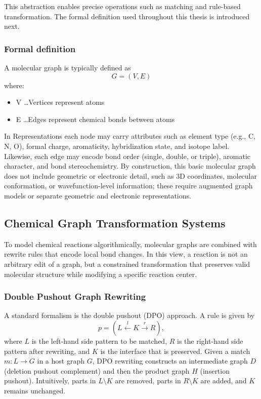 This abstraction enables precise operations such as matching and rule-based transformation. \cite[pp.~2--3]{Andersen2013} 
The formal definition used throughout this thesis is introduced next.

\subsubsection{Formal definition}

A molecular graph is typically defined as \cite[p.~2]{Ehrlich2012} \cite[p.~3]{Fujita2025}
\begin{equation}
    G = (V, E)
\end{equation}
where:
\begin{itemize}
    \item V \ldots Vertices represent atoms
    \item E \ldots Edges represent chemical bonds between atoms
\end{itemize}

In Representations each node may carry attributes such as element type (e.g., C, N, O), formal charge, aromaticity, hybridization state, and isotope label.
Likewise, each edge may encode bond order (single, double, or triple), aromatic character, and bond stereochemistry. \cite[pp.~4--5]{Wojtuch2023}
By construction, this basic molecular graph does not include geometric or electronic detail, such as 3D coordinates, molecular conformation, or wavefunction-level information; these require augmented graph models or separate geometric and electronic representations.
\cite[pp.~3--4]{Wojtuch2023} \cite[p.~595]{Kearnes2016}



\subsection{Chemical Graph Transformation Systems}
To model chemical reactions algorithmically, molecular graphs are combined with rewrite rules that encode local bond changes. \cite[p.~76]{Echahed2016}
In this view, a reaction is not an arbitrary edit of a graph, but a constrained transformation that preserves valid molecular structure while modifying a specific reaction center. \cite[p.~2]{Andersen2013} \cite[p.~6]{Abel2026}

\subsubsection{Double Pushout Graph Rewriting}
A standard formalism is the double pushout (DPO) approach. \cite[p.~3]{Andersen2013} A rule is given by 
\[
p = (L \xleftarrow{l} K \xrightarrow{r} R),
\]
where \(L\) is the left-hand side pattern to be matched, \(R\) is the right-hand side pattern after rewriting, and \(K\) is the interface that is preserved. \cite[p.~75]{Echahed2016}
Given a match \(m:L\to G\) in a host graph \(G\), DPO rewriting constructs an intermediate graph \(D\) (deletion pushout complement) \cite[p.~680]{HABEL2001}and then the product graph \(H\) (insertion pushout). 
Intuitively, parts in \(L\setminus K\) are removed, parts in \(R\setminus K\) are added, and \(K\) remains unchanged. \cite[p.~3]{Andersen2013} \cite[p.~4]{Flamm2025}

